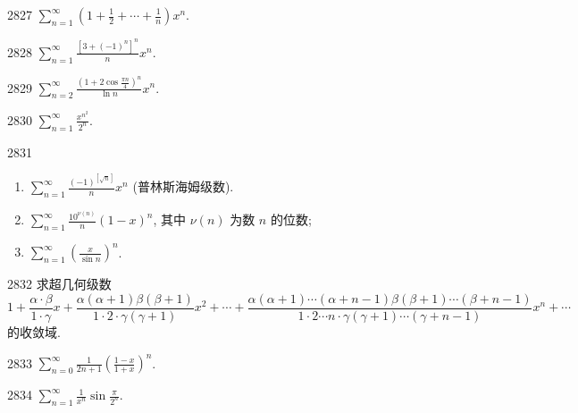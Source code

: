 \begin{prob}[S]{2827}
$\displaystyle\sum_{n=1}^{\infty} \left(1 + \frac{1}{2} + \cdots + \frac{1}{n}\right)x^n$.
\end{prob}

\begin{prob}[S]{2828}
$\displaystyle\sum_{n=1}^{\infty} \frac{[3 + (-1)^n]^n}{n}x^n$.
\end{prob}

\begin{prob}[S]{2829}
$\displaystyle\sum_{n=2}^{\infty} \frac{\left(1 + 2\cos\frac{\pi n}{4}\right)^n}{\ln n}x^n$.
\end{prob}

\begin{prob}[S]{2830}
$\displaystyle\sum_{n=1}^{\infty} \frac{x^{n^2}}{2^n}$.
\end{prob}

\begin{prob}[L]{2831}
\begin{enumerate}[label=(\alph*), itemsep=2pt, topsep=3pt]
\item $\displaystyle\sum_{n=1}^{\infty} \frac{(-1)^{[\sqrt{n}]}}{n}x^n$ (普林斯海姆级数).
\item $\displaystyle\sum_{n=1}^{\infty} \frac{10^{\nu(n)}}{n}(1-x)^n$, 其中 $\nu(n)$ 为数 $n$ 的位数;
\item $\displaystyle\sum_{n=1}^{\infty} \left(\frac{x}{\sin n}\right)^n$.
\end{enumerate}
\end{prob}

\begin{prob}[M]{2832}
求超几何级数
\[
1 + \frac{\alpha \cdot \beta}{1 \cdot \gamma}x + \frac{\alpha(\alpha+1)\beta(\beta+1)}{1 \cdot 2 \cdot \gamma(\gamma+1)}x^2 + \cdots + \frac{\alpha(\alpha+1)\cdots(\alpha+n-1)\beta(\beta+1)\cdots(\beta+n-1)}{1 \cdot 2 \cdots n \cdot \gamma(\gamma+1)\cdots(\gamma+n-1)}x^n + \cdots
\]
的收敛域.
\end{prob}


\begin{prob}[S]{2833}
$\displaystyle\sum_{n=0}^{\infty} \frac{1}{2n+1}\left(\frac{1-x}{1+x}\right)^n$.
\end{prob}

\begin{prob}[S]{2834}
$\displaystyle\sum_{n=1}^{\infty} \frac{1}{x^n}\sin\frac{\pi}{2^n}$.
\end{prob}

